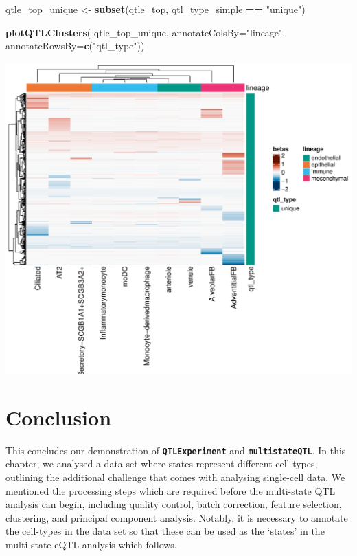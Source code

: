 \documentclass[
]{article}
\newenvironment{Shaded}{\begin{snugshade}}{\end{snugshade}}
\newcommand{\AttributeTok}[1]{\textcolor[rgb]{0.13,0.29,0.53}{#1}}
\newcommand{\FunctionTok}[1]{\textcolor[rgb]{0.13,0.29,0.53}{\textbf{#1}}}
\newcommand{\NormalTok}[1]{#1}
\newcommand{\OtherTok}[1]{\textcolor[rgb]{0.56,0.35,0.01}{#1}}
\newcommand{\SpecialCharTok}[1]{\textcolor[rgb]{0.81,0.36,0.00}{\textbf{#1}}}
\newcommand{\StringTok}[1]{\textcolor[rgb]{0.31,0.60,0.02}{#1}}
\begin{document}
\footnotesize

\begin{Shaded}
\begin{Highlighting}[]
\NormalTok{qtle\_top\_unique }\OtherTok{\textless{}{-}} \FunctionTok{subset}\NormalTok{(qtle\_top, qtl\_type\_simple }\SpecialCharTok{==} \StringTok{"unique"}\NormalTok{)}

\FunctionTok{plotQTLClusters}\NormalTok{(}
\NormalTok{    qtle\_top\_unique, }
    \AttributeTok{annotateColsBy=}\StringTok{"lineage"}\NormalTok{,}
    \AttributeTok{annotateRowsBy=}\FunctionTok{c}\NormalTok{(}\StringTok{"qtl\_type"}\NormalTok{))}
\end{Highlighting}
\end{Shaded}

\includegraphics{Chapter_5_Analysis_files/figure-latex/plot-unique-lung-1.pdf}
\normalsize

\hypertarget{conclusion}{%
\section{Conclusion}\label{conclusion}}

This concludes our demonstration of \textbf{\texttt{QTLExperiment}} and
\textbf{\texttt{multistateQTL}}. In this chapter, we analysed a data set
where states represent different cell-types, outlining the additional
challenge that comes with analysing single-cell data. We mentioned the
processing steps which are required before the multi-state QTL analysis
can begin, including quality control, batch correction, feature
selection, clustering, and principal component analysis. Notably, it is
necessary to annotate the cell-types in the data set so that these can
be used as the `states' in the multi-state eQTL analysis which follows.
\end{document}
